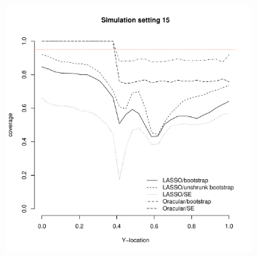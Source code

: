 \documentclass[authoryear, review, 11pt]{elsarticle}
\begin{document}
\begin{figure}
\begin{subfigure}[b]{0.3\textwidth}
			\label{fig:tiger}
		\end{subfigure}
        ~ %
		\begin{subfigure}[b]{0.3\textwidth}
			\centering
			\includegraphics[width=\textwidth]{../../figures/simulation/28-15-profile-coverage.pdf}
			\label{fig:mouse}
		\end{subfigure}
	\end{figure}
	
\end{document}
